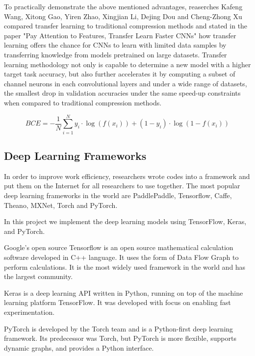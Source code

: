 \documentclass[conference]{IEEEtran}
\begin{document}
To practically demonstrate the above mentioned advantages, reaserches Kafeng Wang, Xitong Gao, Yiren Zhao, Xingjian Li, Dejing Dou and Cheng-Zhong Xu compared transfer learning to traditional compression methods and stated in the paper "Pay Attention to Features, Transfer Learn Faster CNNs" how transfer learning offers the chance for CNNs to learn with limited data samples by transferring knowledge from models pretrained on large datasets. Transfer learning methodology not only is capable to determine a new model with a higher target task accuracy, but also further accelerates it by computing a subset of channel neurons in each convolutional layers and under a wide range of datasets, the smallest drop in validation accuracies under the same speed-up constraints when compared to traditional compression methods.

\begin{equation}
BCE=-\frac{1}{N} \sum_{i=1}^{N} y_{i} \cdot \log \left(f\left(x_{i}\right)\right)+\left(1-y_{i}\right) \cdot \log \left(1-f\left(x_{i}\right)\right)
\end{equation}




\subsection{ Deep Learning Frameworks}
In order to improve work efficiency, researchers wrote codes into a framework and put them on the Internet for all researchers to use together. The most popular deep learning frameworks in the world are PaddlePaddle, Tensorflow, Caffe, Theano, MXNet, Torch and PyTorch. 

In this project we implement the deep learning models using TensorFlow, Keras, and PyTorch. 

Google's open source Tensorflow is an open source mathematical calculation software developed in C++ language. It uses the form of Data Flow Graph to perform calculations. It is the most widely used framework in the world and has the largest community. 

Keras is a deep learning API written in Python, running on top of the machine learning platform TensorFlow. It was developed with focus on enabling fast experimentation.

PyTorch is developed by the Torch team and is a Python-first deep learning framework. Its predecessor was Torch, but PyTorch is more flexible, supports dynamic graphs, and provides a Python interface. 
\end{document}
